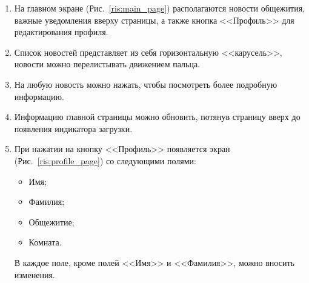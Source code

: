 \documentclass{../includes/TechDoc}
\begin{document}
    \begin{enumerate}
        \item На главном экране (Рис.~\ref{ris:main_page}) располагаются новости общежития, важные уведомления вверху страницы,
        а также кнопка <<Профиль>> для редактирования профиля.
        \item Список новостей представляет из себя горизонтальную <<карусель>>, новости можно перелистывать движением пальца.
        \item На любую новость можно нажать, чтобы посмотреть более подробную информацию.
        \item Информацию главной страницы можно обновить, потянув страницу вверх до появления индикатора загрузки.

        \item При нажатии на кнопку <<Профиль>> появляется экран (Рис.~\ref{ris:profile_page}) со следующими полями:
        \begin{itemize}[noitemsep]
            \item Имя;
            \item Фамилия;
            \item Общежитие;
            \item Комната.
        \end{itemize}
        В каждое поле, кроме полей <<Имя>> и <<Фамилия>>, можно вносить изменения.
        \begin{figure}[ht]
            \begin{center}
                \begin{minipage}[h]{0.33\linewidth}

\end{minipage}
\end{center}
\end{figure}
\end{enumerate}
\end{document}
